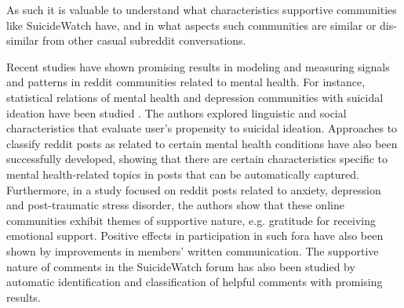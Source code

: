 As such it is valuable to understand what characteristics supportive communities like SuicideWatch have, and in what aspects such communities are similar or dis-similar from other casual subreddit conversations. 

Recent studies have shown promising results in modeling and measuring signals and patterns in reddit communities related to mental health. For instance, statistical relations of mental health and depression communities with suicidal ideation have been studied \cite{DeChoudhury2014,DeChoudhury2016}. The authors explored linguistic and social characteristics that evaluate user's propensity to suicidal ideation. Approaches to classify reddit posts as related to certain mental health conditions have also been successfully developed, showing that there are certain characteristics specific to mental health-related topics in posts that can be automatically captured\cite{gkotsis2017characterisation}. Furthermore, in a study focused on reddit posts related to anxiety, depression and post-traumatic stress disorder, the authors show that these online communities exhibit themes of supportive nature, e.g. gratitude for receiving emotional support\cite{park2018examining}. Positive effects in participation in such fora have also been shown by improvements in members' written communication\cite{info:doi/10.2196/jmir.8219}. The supportive nature of comments in the SuicideWatch forum has also been studied by automatic identification and classification of helpful comments with promising results\cite{Kavuluru:2016:CHC:2975167.2975170}.



